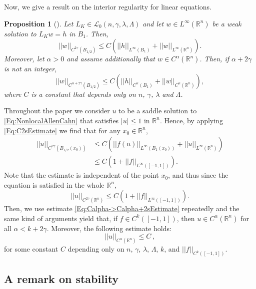 \documentclass[12pt,reqno]{amsart}
\newtheorem{proposition}[theorem]{Proposition}
\theoremstyle{definition}
\theoremstyle{remark}
\newcommand{\con}[1]{\mathbb{#1}}
\newcommand{\R}{\con{R}} %
\newcommand{\lcal}{\mathcal{L}}
\newcommand{\norm}[1]{\left | \left |{#1} \right | \right |}
\newcommand{\s}{\gamma}
\newcommand{\bpar}[1]{\left ( {#1}\right )}
\numberwithin{equation}{section}
\begin{document}
Now, we give a result on the interior regularity for linear equations.

\begin{proposition}[\cite{RosOton-Survey,SerraC2s+alphaRegularity}]
	\label{Prop:InteriorRegularity}
	Let $L_K \in\lcal_0(n,\s,\lambda, \Lambda)$ and let $w\in L^\infty (\R^n)$ be a weak solution to $L_K w = h$ in $B_1$. Then,
	\begin{equation}
	\label{Eq:C2sEstimate}
	\norm{w}_{C^{2\s} (B_{1/2})} \leq C\bpar{\norm{h}_{L^\infty (B_1)} + \norm{w}_{L^\infty  (\R^n)} }.
	\end{equation}
	Moreover, let $\alpha > 0$ and assume additionally that $w \in C^\alpha (\R^n)$. Then, if $\alpha +
	2\s$ is not an integer,
	\begin{equation}
	\label{Eq:Calpha->Calpha+2sEstimate}
	\norm{w}_{C^{\alpha + 2\s} (B_{1/2})} \leq C\bpar{\norm{h}_{C^{\alpha} (B_1)} + \norm{w}_{C^\alpha (\R^n)} },
	\end{equation}
	where $C$ is a constant that depends only on $n$, $\s$, $\lambda$ and $\Lambda$.
\end{proposition}


Throughout the paper we consider $u$ to be a saddle solution to \eqref{Eq:NonlocalAllenCahn} that satisfies $|u|\leq 1$ in $\R^n$. Hence, by applying \eqref{Eq:C2sEstimate} we find that for any $x_0\in \R^n$,
\begin{align*}
\norm{u}_{C^{2\s} (B_{1/2} (x_0))} &\leq C\bpar{\norm{f(u)}_{L^\infty (B_1(x_0))} + \norm{u}_{L^\infty  (\R^n)} } \\
&\leq C\bpar{1 + \norm{f}_{L^\infty ([-1,1])} }.
\end{align*}
Note that the estimate is independent of the point $x_0$, and thus since the equation is satisfied in the whole $\R^n$,
$$
\norm{u}_{C^{2\s}(\R^n)} \leq C\bpar{1 + \norm{f}_{L^\infty ([-1,1])} }.
$$
Then, we use estimate \eqref{Eq:Calpha->Calpha+2sEstimate} repeatedly and the same kind of arguments yield that, if $f\in C^{k}([-1,1])$, then $u\in C^{\alpha}(\R^n)$ for all $\alpha < k+ 2 \s$. Moreover, the following estimate holds:
$$
\norm{u}_{C^{\alpha}(\R^n)} \leq C\,,
$$
for some constant $C$ depending only on $n$, $\s$, $\lambda$, $\Lambda$, $k$, and $\norm{f}_{C^k([-1,1])}$.



\subsection{A remark on stability}
\label{Subsec:RemarkStability}
\end{document}
